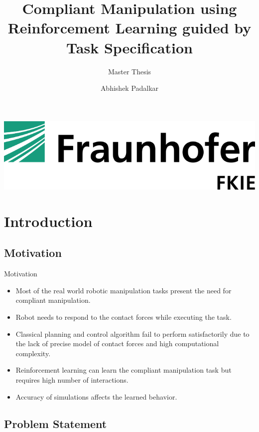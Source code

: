 \documentclass[aspectratio=43,10pt,fleqn,t]{beamer}
\title{Compliant Manipulation using Reinforcement Learning guided by Task Specification}
\subtitle{Master Thesis}
\author{Abhishek Padalkar}
\begin{document}
\titlebackgroundtrue
\begin{frame}[plain]
 \titlepage
 \centering
 \includegraphics[scale=0.5]{FKIE-logo}
\end{frame}
\titlebackgroundfalse


\section{Introduction}
\subsection{Motivation}

\begin{frame}{Motivation}
\begin{itemize}
	\item Most of the real world robotic manipulation tasks present the need for compliant manipulation.

	\item Robot needs to respond to the contact forces while executing the task.
	
	\item Classical planning and control algorithm fail to perform satisfactorily due to the lack of precise model of contact forces and high computational complexity. 
	
	\item Reinforcement learning can learn the compliant manipulation task but requires high number of interactions.
	
	\item Accuracy of simulations affects the learned behavior.
\end{itemize}
\end{frame}

\subsection{Problem Statement}
\end{document}
